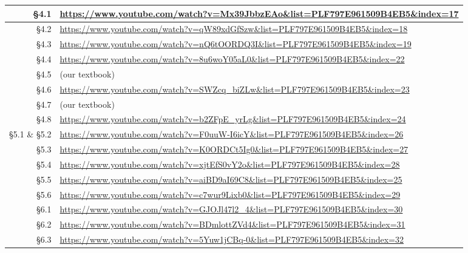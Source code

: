 \documentclass[12pt]{article}
\newcounter{ex}\setcounter{ex}{0}
\begin{document}
\begin{tabular} {|r| l |}
\S4.1 & \url{https://www.youtube.com/watch?v=Mx39JbbzEAo&list=PLF797E961509B4EB5&index=17} \\ \hline
\S4.2 & \url{https://www.youtube.com/watch?v=qW89xdGfSzw&list=PLF797E961509B4EB5&index=18} \\ \hline
\S4.3 & \url{https://www.youtube.com/watch?v=nQ6tOORDQ3I&list=PLF797E961509B4EB5&index=19} \\ \hline
\S4.4 & \url{https://www.youtube.com/watch?v=8u6woY05aL0&list=PLF797E961509B4EB5&index=22}  \\ \hline
\S4.5 &  (our textbook)    \\ \hline
\S4.6 & \url{https://www.youtube.com/watch?v=SWZcq_biZLw&list=PLF797E961509B4EB5&index=23} \\ \hline
\S4.7 & (our textbook)   \\ \hline
\S4.8 & \url{https://www.youtube.com/watch?v=b2ZFpE_yrLg&list=PLF797E961509B4EB5&index=24} \\ \hline
\S5.1 \& \S5.2  & \url{https://www.youtube.com/watch?v=F0uuW-I6icY&list=PLF797E961509B4EB5&index=26}  \\ \hline
\S5.3 & \url{https://www.youtube.com/watch?v=K0ORDCt5Ig0&list=PLF797E961509B4EB5&index=27} \\ \hline
\S5.4 & \url{https://www.youtube.com/watch?v=xjtEfS0vY2o&list=PLF797E961509B4EB5&index=28} \\ \hline
\S5.5 & \url{https://www.youtube.com/watch?v=aiBD9aI69C8&list=PLF797E961509B4EB5&index=25} \\ \hline
\S5.6 & \url{https://www.youtube.com/watch?v=c7wur9Lixb0&list=PLF797E961509B4EB5&index=29}  \\ \hline
\S6.1 &  \url{https://www.youtube.com/watch?v=GJOJl47l2_4&list=PLF797E961509B4EB5&index=30}  \\ \hline
\S6.2 & \url{https://www.youtube.com/watch?v=BDmlottZVd4&list=PLF797E961509B4EB5&index=31}  \\ \hline
\S6.3 & \url{https://www.youtube.com/watch?v=5Yuw1jCBq-0&list=PLF797E961509B4EB5&index=32}   \\ \hline
\end{tabular}
  
 
\end{document}
